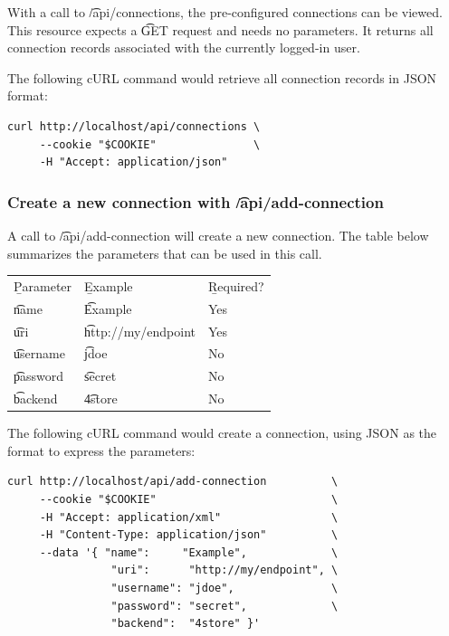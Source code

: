   With a call to \t{/api/connections}, the pre-configured connections
  can be viewed.  This resource expects a \t{GET} request and needs no
  parameters.  It returns all connection records associated with the currently
  logged-in user.

  The following cURL command would retrieve all connection records in JSON
  format:

\begin{siderules}
\begin{verbatim}
curl http://localhost/api/connections \
     --cookie "$COOKIE"               \
     -H "Accept: application/json"
\end{verbatim}
\end{siderules}

\subsubsection{Create a new connection with \t{/api/add-connection}}
\label{sec:api-create-connection}

  A call to \t{/api/add-connection} will create a new connection.
  The table below summarizes the parameters that can be used in this call.

  \hypersetup{urlcolor=black}
  \begin{table}[H]
    \begin{tabularx}{\textwidth}{l!{\VRule[-1pt]}X!{\VRule[-1pt]}X}
      \headrow
      \b{Parameter} & \b{Example}            & \b{Required?}\\
      \evenrow
      \t{name}      & \t{Example}            & Yes\\
      \oddrow
      \t{uri}       & \t{http://my/endpoint} & Yes\\
      \evenrow
      \t{username}  & \t{jdoe}               & No\\
      \oddrow
      \t{password}  & \t{secret}             & No\\
      \evenrow
      \t{backend}   & \t{4store}             & No\\
    \end{tabularx}
  \end{table}
  \hypersetup{urlcolor=LinkGray}

  The following cURL command would create a connection, using JSON as
  the format to express the parameters:

\begin{siderules}
\begin{verbatim}
curl http://localhost/api/add-connection          \
     --cookie "$COOKIE"                           \
     -H "Accept: application/xml"                 \
     -H "Content-Type: application/json"          \
     --data '{ "name":     "Example",             \
                "uri":      "http://my/endpoint", \
                "username": "jdoe",               \
                "password": "secret",             \
                "backend":  "4store" }'
\end{verbatim}
\end{siderules}

